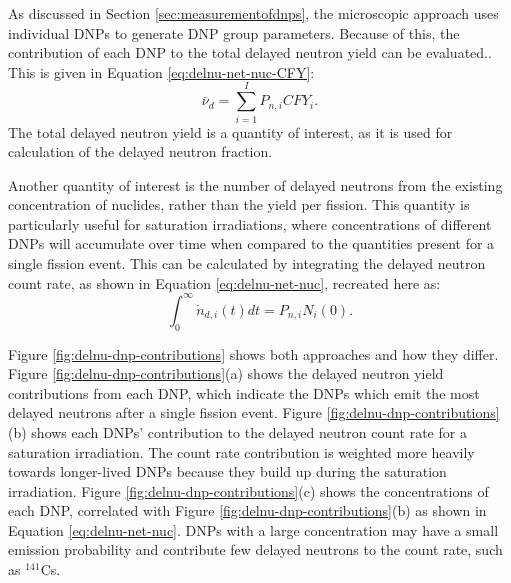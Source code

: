 
As discussed in Section \ref{sec:measurementofdnps}, the microscopic approach uses individual \glspl{DNP} to generate \gls{DNP} group parameters.
Because of this, the contribution of each \gls{DNP} to the total delayed neutron yield can be evaluated..
This is given in Equation \eqref{eq:delnu-net-nuc-CFY}:
\begin{equation}
    \bar{\nu}_d = \sum_{i=1}^I P_{n, i} CFY_i. \nonumber
\end{equation}
The total delayed neutron yield is a quantity of interest, as it is used for calculation of the delayed neutron fraction.

Another quantity of interest is the number of delayed neutrons from the existing concentration of nuclides, rather than the yield per fission.
This quantity is particularly useful for saturation irradiations, where concentrations of different \glspl{DNP} will accumulate over time when compared to the quantities present for a single fission event.
This can be calculated by integrating the delayed neutron count rate, as shown in Equation \eqref{eq:delnu-net-nuc}, recreated here as:
\begin{equation}
    \int_0^{\infty} \dot{n}_{d, i}(t) dt= P_{n, i} N_{i} (0). \nonumber
\end{equation}

Figure \ref{fig:delnu-dnp-contributions} shows both approaches and how they differ.
Figure \ref{fig:delnu-dnp-contributions}(a) shows the delayed neutron yield contributions from each \gls{DNP}, which indicate the \glspl{DNP} which emit the most delayed neutrons after a single fission event.
Figure \ref{fig:delnu-dnp-contributions}(b) shows each \glspl{DNP}' contribution to the delayed neutron count rate for a saturation irradiation.
The count rate contribution is weighted more heavily towards longer-lived \glspl{DNP} because they build up during the saturation irradiation.
Figure \ref{fig:delnu-dnp-contributions}(c) shows the concentrations of each \gls{DNP}, correlated with Figure \ref{fig:delnu-dnp-contributions}(b) as shown in Equation \eqref{eq:delnu-net-nuc}.
\Glspl{DNP} with a large concentration may have a small emission probability and contribute few delayed neutrons to the count rate, such as $^{141}$Cs.

